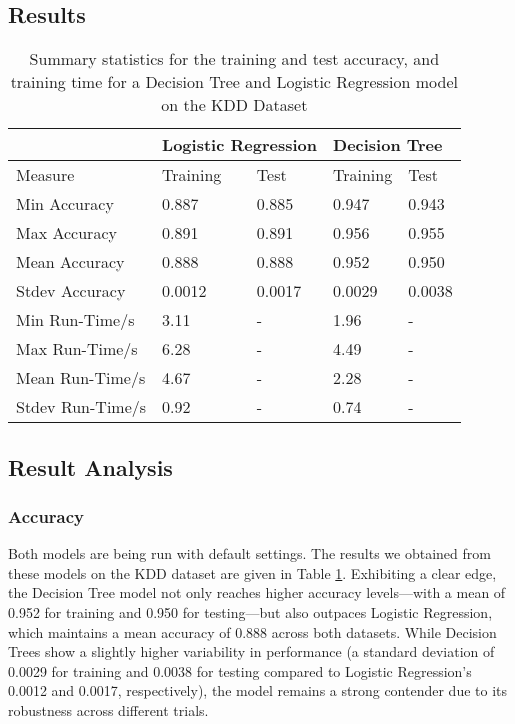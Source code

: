 \documentclass[12pt, letterpaper]{article}
\begin{document}
\subsection{Results}
\begin{table}[h]
\centering
\caption{Summary statistics for the training and test accuracy, and training time for a Decision Tree and Logistic Regression model on the KDD Dataset}
\label{results table}
\begin{tabular}{|l|ll|ll|}
\hline
               & \multicolumn{2}{l|}{Logistic Regression}                     & \multicolumn{2}{l|}{Decision Tree}    \\ \hline
Measure        & \multicolumn{1}{l|}{Training}           & Test               & \multicolumn{1}{l|}{Training} & Test  \\ \hline
Min Accuracy   & \multicolumn{1}{l|}{0.887} & 0.885 & \multicolumn{1}{l|}{0.947}    & 0.943 \\ \hline
Max Accuracy   & \multicolumn{1}{l|}{0.891} & 0.891 & \multicolumn{1}{l|}{0.956}    & 0.955 \\ \hline
Mean Accuracy  & \multicolumn{1}{l|}{0.888} & 0.888 & \multicolumn{1}{l|}{0.952}    & 0.950 \\ \hline
Stdev Accuracy & \multicolumn{1}{l|}{0.0012} & 0.0017 & \multicolumn{1}{l|}{0.0029} & 0.0038 \\ \hline
Min Run-Time/s   & \multicolumn{1}{l|}{3.11}  & -                & \multicolumn{1}{l|}{1.96}     & -   \\ \hline
Max Run-Time/s   & \multicolumn{1}{l|}{6.28} & -                & \multicolumn{1}{l|}{4.49}     & -   \\ \hline
Mean Run-Time/s  & \multicolumn{1}{l|}{4.67}   & -                & \multicolumn{1}{l|}{2.28}     & -   \\ \hline
Stdev Run-Time/s & \multicolumn{1}{l|}{0.92} & -                & \multicolumn{1}{l|}{0.74}     & -   \\ \hline
\end{tabular}
\end{table}

\subsection{Result Analysis}
\subsubsection{Accuracy}
Both models are being run with default settings. The results we obtained from these models on the KDD dataset are given in Table \ref{results table}. Exhibiting a clear edge, the Decision Tree model not only reaches higher accuracy levels—with a mean of 0.952 for training and 0.950 for testing—but also outpaces Logistic Regression, which maintains a mean accuracy of 0.888 across both datasets. While Decision Trees show a slightly higher variability in performance (a standard deviation of 0.0029 for training and 0.0038 for testing compared to Logistic Regression's 0.0012 and 0.0017, respectively), the model remains a strong contender due to its robustness across different trials.
\end{document}
